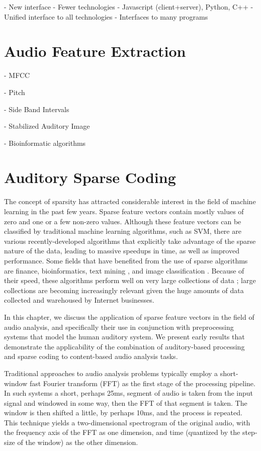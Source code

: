 \documentclass[12pt,oneside]{book}
\begin{document}
- New interface
	- Fewer technologies
		- Javascript (client+server), Python, C++
	- Unified interface to all technologies
	- Interfaces to many programs




\section{Audio Feature Extraction}


- MFCC


- Pitch


- Side Band Intervals


- Stabilized Auditory Image


- Bioinformatic algorithms


\section{Auditory Sparse Coding}

The concept of sparsity has attracted considerable interest in the
field of machine learning in the past few years.  Sparse feature
vectors contain mostly values of zero and one or a few non-zero
values.  Although these feature vectors can be classified by
traditional machine learning algorithms, such as SVM, there are
various recently-developed algorithms that explicitly take advantage
of the sparse nature of the data, leading to massive speedups in time,
as well as improved performance.  Some fields that have benefited from
the use of sparse algorithms are finance, bioinformatics, text mining
\cite{balakrishnan2008}, and image classification \cite{chechik2010}.
Because of their speed, these algorithms perform well on very large
collections of data \cite{bottou2007}; large collections are becoming
increasingly relevant given the huge amounts of data collected and
warehoused by Internet businesses.

In this chapter, we discuss the application of sparse feature vectors
in the field of audio analysis, and specifically their use in conjunction with 
preprocessing systems that model the human auditory system. We present early
results that demonstrate the applicability of the combination of 
auditory-based processing and sparse coding to content-based audio analysis 
tasks.

Traditional approaches to audio analysis problems typically employ a 
short-window fast Fourier transform (FFT) as the first stage of the processing 
pipeline. In such systems a short, perhaps 25ms, segment of audio is taken 
from the input signal and windowed in some way, then the FFT of that segment 
is taken. The window is then shifted a little, by perhaps 10ms, and the 
process is repeated. This technique yields a two-dimensional spectrogram of 
the original audio, with the frequency axis of the FFT as one dimension, and 
time (quantized by the step-size of the window) as the other dimension.
\end{document}
